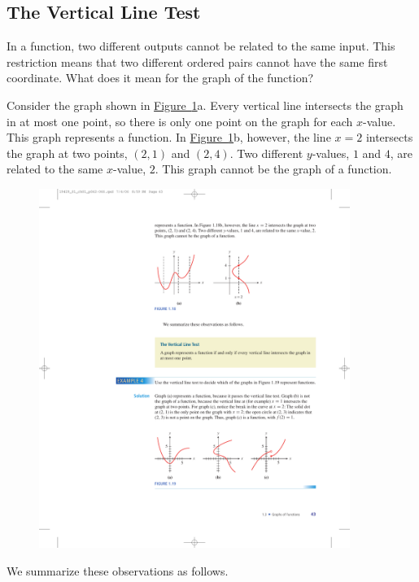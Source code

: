 \documentclass[10pt,]{book}
\theoremstyle{plain}
\theoremstyle{definition}
\theoremstyle{definition}
\begin{document}
\subsection[The Vertical Line Test]{The Vertical Line Test}\label{subsection-3}
In a function, two different outputs cannot be related to the same input. This restriction means that two different ordered pairs cannot have the same first coordinate. What does it mean for the graph of the function?%
\par
Consider the graph shown in \hyperref[fig-vertical-line-test]{Figure~\ref{fig-vertical-line-test}}a. Every vertical line intersects the graph in at most one point, so there is only one point on the graph for each \(x\)-value. This graph represents a function. In \hyperref[fig-vertical-line-test]{Figure~\ref{fig-vertical-line-test}}b, however, the line \(x = 2\) intersects the graph at two points, \((2, 1)\) and \((2, 4)\). Two different \(y\)-values, \(1\) and \(4\), are related to the same \(x\)-value, \(2\). This graph cannot be the graph of a function.%
\leavevmode%
\begin{figure}
\centering
\includegraphics[width=0.90\textwidth,]{images/fig-vertical-line-test.pdf}\caption{\label{fig-vertical-line-test}}
\end{figure}
\par
We summarize these observations as follows.%
\typeout{************************************************}
\typeout{************************************************}
\end{document}
